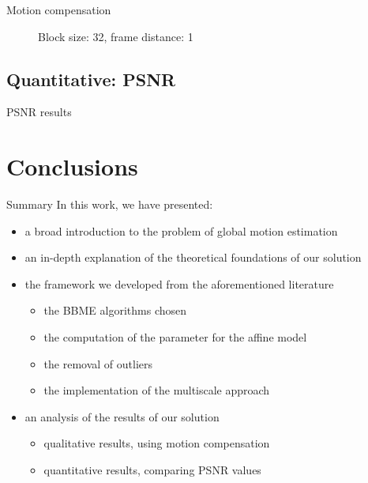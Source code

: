 \documentclass[aspectratio=1610,xcolor=dvipsnames]{beamer}
\begin{document}
\begin{frame}{Motion compensation}
\begin{figure}[htbp]
        \caption{Block size: 32, frame distance: 1}
    \end{figure}
\end{frame}

\subsection{Quantitative: PSNR}
\begin{frame}{PSNR results}
    \begin{table}
        \label{tab:psnr}
        
        \caption{PSNR result on a some example video sequences}
    \end{table}    
\end{frame}


\section{Conclusions}
\begin{frame}
    \begin{block}{Summary}
        In this work, we have presented:
        \begin{itemize}
            \item a broad introduction to the problem of global motion estimation
            \item an in-depth explanation of the theoretical foundations of our solution
            \item the framework we developed from the aforementioned literature
            \begin{itemize}
                \item the BBME algorithms chosen
                \item the computation of the parameter for the affine model
                \item the removal of outliers
                \item the implementation of the multiscale approach
            \end{itemize}
            \item an analysis of the results of our solution
            \begin{itemize}
                \item qualitative results, using motion compensation
                \item quantitative results, comparing PSNR values
            \end{itemize} 
        \end{itemize}        
    \end{block}
\end{frame}
\end{document}

